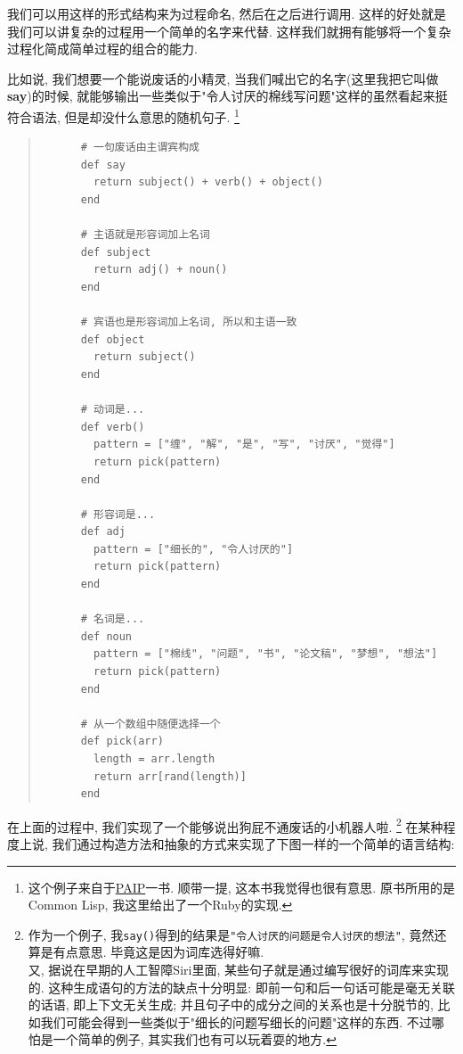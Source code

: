 \begin{example}
  我们可以用这样的形式结构来为过程命名, 然后在之后进行调用. 这样的好处就是我们可以讲复杂的过程用一个简单的名字来代替. 这样我们就拥有能够将一个复杂过程化简成简单过程的组合的能力. 

  比如说, 我们想要一个能说废话的小精灵, 当我们喊出它的名字(这里我把它叫做\textbf{say})的时候, 就能够输出一些类似于"令人讨厌的棉线写问题"这样的虽然看起来挺符合语法, 但是却没什么意思的随机句子. \footnote{这个例子来自于\href{https://github.com/norvig/paip-lisp}{PAIP}一书. 顺带一提, 这本书我觉得也很有意思. 原书所用的是Common Lisp, 我这里给出了一个Ruby的实现. }
  
  \begin{quotation}
    \begin{verbatim}
      # 一句废话由主谓宾构成
      def say
        return subject() + verb() + object()
      end
      
      # 主语就是形容词加上名词
      def subject
        return adj() + noun()
      end
      
      # 宾语也是形容词加上名词, 所以和主语一致
      def object
        return subject()
      end
      
      # 动词是...
      def verb()
        pattern = ["缠", "解", "是", "写", "讨厌", "觉得"]
        return pick(pattern)
      end
      
      # 形容词是...
      def adj
        pattern = ["细长的", "令人讨厌的"]
        return pick(pattern)
      end
      
      # 名词是...
      def noun
        pattern = ["棉线", "问题", "书", "论文稿", "梦想", "想法"]
        return pick(pattern)
      end
      
      # 从一个数组中随便选择一个
      def pick(arr)
        length = arr.length
        return arr[rand(length)]
      end
    \end{verbatim}
  \end{quotation}

  在上面的过程中, 我们实现了一个能够说出狗屁不通废话的小机器人啦. \footnote{作为一个例子, 我\texttt{say()}得到的结果是\texttt{"令人讨厌的问题是令人讨厌的想法"}, 竟然还算是有点意思. 毕竟这是因为词库选得好嘛. \\ 又, 据说在早期的人工智障Siri里面, 某些句子就是通过编写很好的词库来实现的. 这种生成语句的方法的缺点十分明显: 即前一句和后一句话可能是毫无关联的话语, 即上下文无关生成; 并且句子中的成分之间的关系也是十分脱节的, 比如我们可能会得到一些类似于"细长的问题写细长的问题"这样的东西. 不过哪怕是一个简单的例子, 其实我们也有可以玩着耍的地方. } 在某种程度上说, 我们通过构造方法和抽象的方式来实现了下图一样的一个简单的语言结构: 


\end{example}
